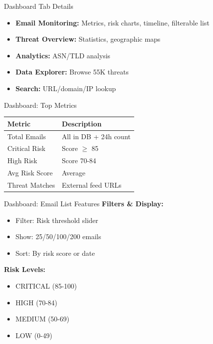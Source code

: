 \documentclass[aspectratio=169]{beamer}
\begin{document}
\begin{frame}{Dashboard Tab Details}
\begin{itemize}
    \item \textbf{Email Monitoring:} Metrics, risk charts, timeline, filterable list
    \item \textbf{Threat Overview:} Statistics, geographic maps
    \item \textbf{Analytics:} ASN/TLD analysis
    \item \textbf{Data Explorer:} Browse 55K threats
    \item \textbf{Search:} URL/domain/IP lookup
\end{itemize}
\end{frame}

\begin{frame}{Dashboard: Top Metrics}
\begin{center}
\small
\begin{tabular}{ll}
\toprule
\textbf{Metric} & \textbf{Description} \\
\midrule
Total Emails & All in DB + 24h count \\
Critical Risk & Score $\geq$ 85 \\
High Risk & Score 70-84 \\
Avg Risk Score & Average \\
Threat Matches & External feed URLs \\
\bottomrule
\end{tabular}
\end{center}
\end{frame}

\begin{frame}{Dashboard: Email List Features}
\small
\textbf{Filters \& Display:}
\begin{itemize}
    \item Filter: Risk threshold slider
    \item Show: 25/50/100/200 emails
    \item Sort: By risk score or date
\end{itemize}

\vspace{0.2cm}
\textbf{Risk Levels:}
\begin{itemize}
    \item \textcolor{criticalred}{CRITICAL (85-100)}
    \item \textcolor{highorange}{HIGH (70-84)}
    \item \textcolor{mediumyellow}{MEDIUM (50-69)}
    \item \textcolor{lowgreen}{LOW (0-49)}
\end{itemize}
\end{frame}
\end{document}
